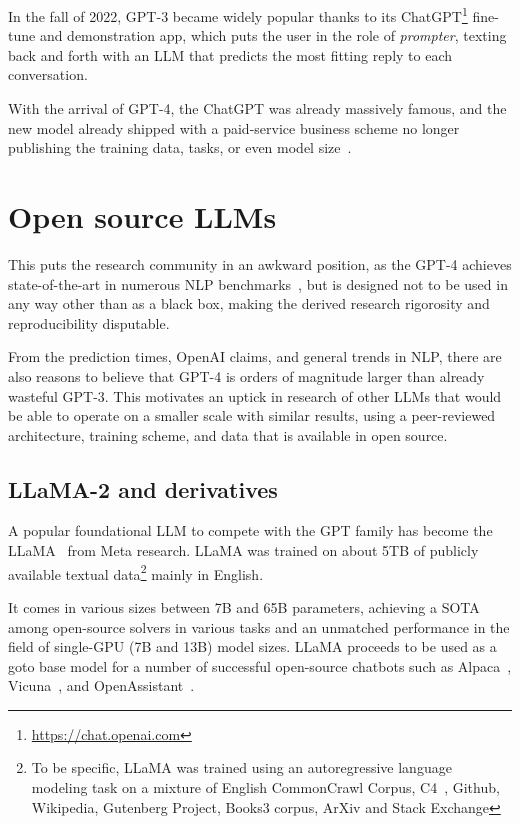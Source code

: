 In the fall of 2022, GPT-3 became widely popular thanks to its \textsf{ChatGPT}\footnote{\url{https://chat.openai.com}} fine-tune and demonstration app, which puts the user in the role of \textit{prompter}, texting back and forth with an LLM that predicts the most fitting reply to each conversation.

With the arrival of GPT-4, the \textsf{ChatGPT} was already massively famous, and the new model already shipped with a paid-service business scheme no longer publishing the training data, tasks, or even model size~\cite{gpt4}.

\section{Open source LLMs}
This puts the research community in an awkward position, as the GPT-4 achieves state-of-the-art in numerous NLP benchmarks~\cite{gpt4, Liu_2023}, but is designed not to be used in any way other than as a black box, making the derived research rigorosity and reproducibility disputable.

From the prediction times, \textsf{OpenAI} claims, and general trends in NLP, there are also reasons to believe that GPT-4 is orders of magnitude larger than already wasteful GPT-3.
This motivates an uptick in research of other LLMs that would be able to operate on a smaller scale with similar results, using a peer-reviewed architecture, training scheme, and data that is available in open source.

\subsection{LLaMA-2 and derivatives}
\label{sec:llama}

A popular foundational LLM to compete with the GPT family has become the \textsf{LLaMA}~\cite{llama} from \textsf{Meta research}. LLaMA was trained on about 5TB of publicly available textual data\footnote{To be specific, LLaMA was trained using an autoregressive language modeling task on a mixture of English CommonCrawl Corpus, C4~\cite{t5-11b}, Github, Wikipedia, Gutenberg Project, Books3 corpus, ArXiv and Stack Exchange} mainly in English. 

It comes in various sizes between 7B and 65B parameters, achieving a SOTA among open-source solvers in various tasks and an unmatched performance in the field of single-GPU (7B and 13B) model sizes.
LLaMA proceeds to be used as a goto base model for a number of successful open-source chatbots such as Alpaca~\cite{alpaca}, Vicuna~\cite{vicuna}, and OpenAssistant~\cite{openassistant}.

